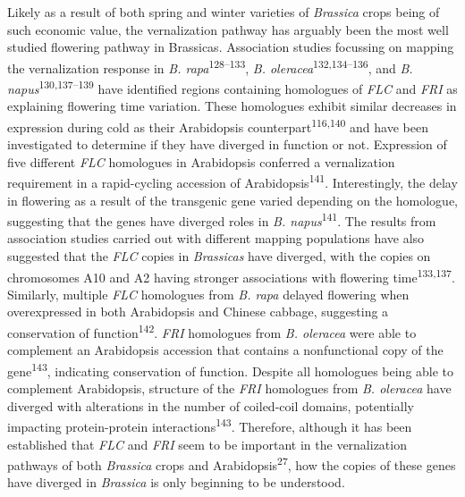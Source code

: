 \documentclass[12pt,]{book}
\begin{document}
Likely as a result of both spring and winter varieties of
\emph{Brassica} crops being of such economic value, the vernalization
pathway has arguably been the most well studied flowering pathway in
Brassicas. Association studies focussing on mapping the vernalization
response in \emph{B. rapa}\textsuperscript{128--133}, \emph{B.
oleracea}\textsuperscript{132,134--136}, and \emph{B.
napus}\textsuperscript{130,137--139} have identified regions containing
homologues of \emph{FLC} and \emph{FRI} as explaining flowering time
variation. These homologues exhibit similar decreases in expression
during cold as their Arabidopsis counterpart\textsuperscript{116,140}
and have been investigated to determine if they have diverged in
function or not. Expression of five different \emph{FLC} homologues in
Arabidopsis conferred a vernalization requirement in a rapid-cycling
accession of Arabidopsis\textsuperscript{141}. Interestingly, the delay
in flowering as a result of the transgenic gene varied depending on the
homologue, suggesting that the genes have diverged roles in \emph{B.
napus}\textsuperscript{141}. The results from association studies
carried out with different mapping populations have also suggested that
the \emph{FLC} copies in \emph{Brassicas} have diverged, with the copies
on chromosomes A10 and A2 having stronger associations with flowering
time\textsuperscript{133,137}. Similarly, multiple \emph{FLC} homologues
from \emph{B. rapa} delayed flowering when overexpressed in both
Arabidopsis and Chinese cabbage, suggesting a conservation of
function\textsuperscript{142}. \emph{FRI} homologues from \emph{B.
oleracea} were able to complement an Arabidopsis accession that contains
a nonfunctional copy of the gene\textsuperscript{143}, indicating
conservation of function. Despite all homologues being able to
complement Arabidopsis, structure of the \emph{FRI} homologues from
\emph{B. oleracea} have diverged with alterations in the number of
coiled-coil domains, potentially impacting protein-protein
interactions\textsuperscript{143}. Therefore, although it has been
established that \emph{FLC} and \emph{FRI} seem to be important in the
vernalization pathways of both \emph{Brassica} crops and
Arabidopsis\textsuperscript{27}, how the copies of these genes have
diverged in \emph{Brassica} is only beginning to be understood.
\end{document}
